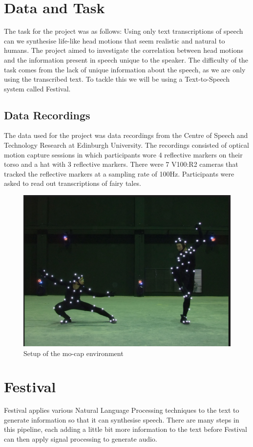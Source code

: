 \documentclass[bsc,frontabs,twoside,singlespacing,parskip]{infthesis}
\begin{document}
\section{Data and Task}

The task for the project was as follows: Using only text transcriptions of speech can we synthesise life-like head motions that seem realistic and natural to humans. The project aimed to investigate the correlation between head motions and the information present in speech unique to the speaker. The difficulty of the task comes from the lack of unique information about the speech, as we are only using the transcribed text. To tackle this we will be using a Text-to-Speech system called Festival.

\subsection{Data Recordings}

The data used for the project was data recordings from the Centre of Speech and Technology Research at Edinburgh University. The recordings consisted of optical motion capture sessions in which participants wore 4 reflective markers on their torso and a hat with 3 reflective markers. There were 7 V100:R2 cameras that tracked the reflective markers at a sampling rate of 100Hz. Participants were asked to read out transcriptions of fairy tales.

\begin{figure}[h!]
	\centering
	\includegraphics[width=.5\textwidth]{mocap.png}
	\caption{Setup of the mo-cap environment}
\end{figure}

\section{Festival}

Festival applies various Natural Language Processing techniques to the text to generate information  so that it can synthesise speech.  There are many steps in this pipeline, each adding a little bit more information to the text before Festival can then apply signal processing to generate audio. 
\end{document}
